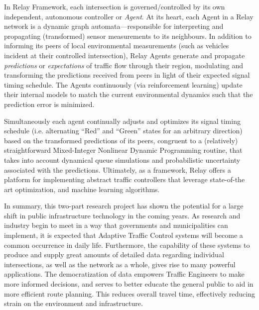 \documentclass{report}
\begin{document}
In Relay Framework, each intersection is governed/controlled by its own independent, autonomous controller or \emph{Agent}.
At its heart, each Agent in a Relay network is a dynamic graph automata---responsible for interpreting and propagating (transformed) sensor measurements to its neighbours.
In addition to informing its peers of local environmental measurements (such as vehicles incident at their controlled intersection), Relay Agents generate and propagate \emph{predictions} or \emph{expectations} of traffic flow through their region, modulating and transforming the predictions received from peers in light of their expected signal timing schedule.
The Agents continuously (via reinforcement learning) update their internal models to match the current environmental dynamics such that the prediction error is minimized.

Simultaneously each agent continually adjusts and optimizes its signal timing schedule (i.e. alternating ``Red'' and ``Green'' states for an arbitrary direction) based on the transformed predictions of its peers, congruent to a (relatively) straightforward Mixed-Integer Nonlinear Dynamic Programming routine, that takes into account dynamical queue simulations and probabilistic uncertainty associated with the predictions.
Ultimately, as a framework, Relay offers a platform for implementing abstract traffic controllers that leverage state-of-the art optimization, and machine learning algorithms.

In summary, this two-part research project has shown the potential for a large shift in public infrastructure technology in the coming years.
As research and industry begin to meet in a way that governments and municipalities can implement, it is expected that Adaptive Traffic Control systems will become a common occurrence in daily life.
Furthermore, the capability of these systems to produce and supply great amounts of detailed data regarding individual intersections, as well as the network as a whole, gives rise to many powerful applications.
The democratization of data empowers Traffic Engineers to make more informed decisions, and serves to better educate the general public to aid in more efficient route planning.
This reduces overall travel time, effectively reducing strain on the environment and infrastructure.
\end{document}

